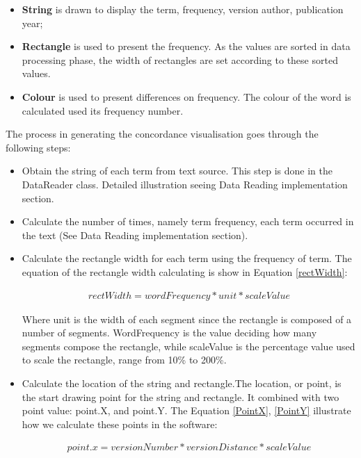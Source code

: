 \begin{itemize}
	\item \textbf{String} is drawn to display the term, frequency, version author, publication year; 
	\item \textbf{Rectangle} is used to present the frequency. As the values are sorted in data processing phase, the width of rectangles are set according to these sorted values.
	\item \textbf{Colour} is used to present differences on frequency. The colour of the word is calculated used its frequency number. 
\end{itemize}

The process in generating the concordance visualisation goes through the following steps:
\begin{itemize}
	\item \textbf{} Obtain the string of each term from text source. This step is done in the DataReader class. Detailed illustration seeing Data Reading implementation section.
	\item \textbf{} Calculate the number of times, namely term frequency, each term occurred in the text (See Data Reading implementation section).  	
	\item \textbf{} Calculate the rectangle width for each term using the frequency of term. The equation of the rectangle width calculating is show in Equation \eqref{rectWidth}:
	
	\begin{multline}\label{rectWidth}
	rectWidth=wordFrequency*unit*scaleValue
	\end{multline}
	
	Where unit is the width of each segment since the rectangle is composed of a number of segments. WordFrequency is the value deciding how many segments compose the rectangle, while scaleValue is the percentage value used to scale the rectangle, range from 10\% to 200\%.
	
	\item \textbf{}Calculate the location of the string and rectangle.The location, or point, is the start drawing point for the string and rectangle. It combined with two point value: point.X, and point.Y. The Equation \eqref{PointX}, \eqref{PointY} illustrate how we calculate these points in the software:
	
	\begin{multline}\label{PointX}
	point.x=versionNumber*versionDistance*scaleValue
	\end{multline}
	

\end{itemize}
